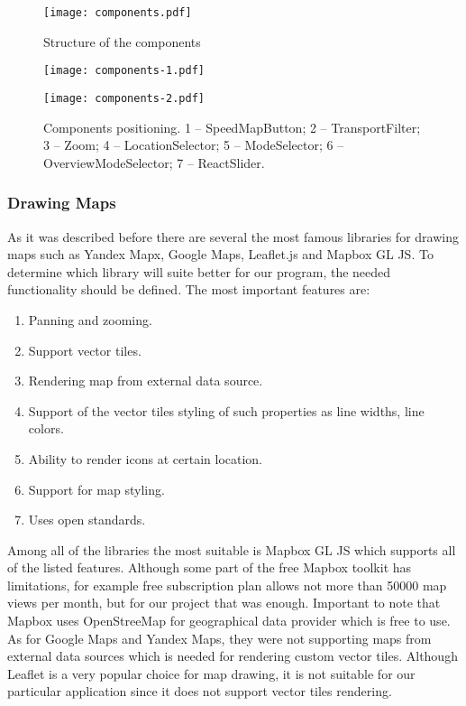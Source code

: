 \begin{figure}[ht]
  \centering
  \texttt{[image: components.pdf]}
  \caption{Structure of the components}
  \label{pic:comp-diag}
\end{figure}

\begin{figure}[ht]
  \captionsetup{justification=centering,margin=1cm}
  \centering
  \texttt{[image: components-1.pdf]}

  \par \vspace{0.5cm}

  \texttt{[image: components-2.pdf]}
  \caption{Components positioning. 1 -- SpeedMapButton; 2 -- TransportFilter; 3 -- Zoom;
  4 -- LocationSelector; 5 -- ModeSelector; 6 -- OverviewModeSelector; 7 -- ReactSlider.
  }
  \label{pic:comp-screen}
\end{figure}


\subsubsection{Drawing Maps}

As it was described before there are several the most famous libraries for drawing maps
such as Yandex Mapx, Google Maps, Leaflet.js and Mapbox GL JS. To determine which library will
suite better for our program, the needed functionality should be defined. The most important
features are:

\begin{enumerate}
  \item Panning and zooming.
  \item Support vector tiles.
  \item Rendering map from external data source.
  \item Support of the vector tiles styling of such properties as line widths, line colors.
  \item Ability to render icons at certain location.
  \item Support for map styling.
  \item Uses open standards.
\end{enumerate}

Among all of the libraries the most suitable is Mapbox GL JS which supports all of the listed features.
Although some part of the free Mapbox toolkit has limitations, for example free subscription
plan allows not more than 50000 map views per month, but for our project that was enough.
Important to note that Mapbox uses OpenStreeMap for geographical data provider which is
free to use.
As for Google Maps and Yandex Maps, they were not supporting maps from external data sources which
is needed for rendering custom vector tiles.
Although Leaflet is a very popular choice for map drawing, it is not suitable for our particular
application since it does not support vector tiles rendering.


